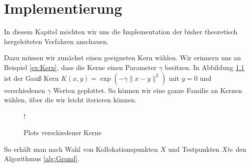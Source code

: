 \chapter{Implementierung}
\label{cha:Implementierung}

In diesem Kapitel möchten wir uns die Implementation der bisher theoretisch hergeleiteten Verfahren anschauen.

Dazu müssen wir zunächst einen geeigneten Kern wählen. Wir erinnern uns an Beispiel \ref{ex:Kern}, dass die Kerne einen Parameter $\gamma$ besitzen. In Abbildung \ref{fig:Kerne} ist der Gauß Kern $K(x,y) = \exp\left(-\gamma \|x-y\|^2\right)$ mit $y= 0$ und verschiedenen $\gamma$ Werten geplottet. So können wir eine ganze Familie an Kernen wählen, über die wir leicht iterieren können.
\begin{figure}[h]
\centering
\resizebox {.65\columnwidth} {!} {

}
\caption{Plots verschiedener Kerne}
\label{fig:Kerne}
\end{figure}

So erhält man nach Wahl von Kollokationspunkten $X$ und Testpunkten $Xte$ den Algorithmus \ref{alg:Grund}.


